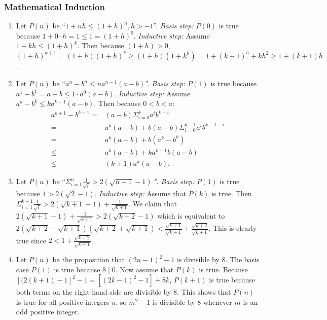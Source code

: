 \documentclass{../../cls/sig-alternate-05-2015}
\begin{document}
\subsubsection{Mathematical Induction}
\begin{enumerate}
\item Let $P(n)$ be \textquotedblleft $1 + nh \le (1 + h)^n, h > -1$\textquotedblright.
\textit{Basis step:} $P(0)$ is true because $1 + 0 \cdot h = 1 \le 1 = (1 + h)^0$.
\textit{Inductive step:} Assume $1 + kh \le (1 + h)^k$. Then because
$(1+h) > 0$, $(1 + h)^{k + 1} = (1 + h)(1 + h)^k \ge (1 + h)(1 + k^h) = 1 + (k + 1)^h + kh^2 \ge 1 + (k + 1)h$.
	
\item Let $P(n)$ be \textquotedblleft $a^n - b^n \le na^{n - 1}(a - b)$\textquotedblright. \textit{Basis step:} $P(1)$ is true because $a^1 - b^1 = a - b \le 1 \cdot a^0 (a - b)$. \textit{Inductive step:} Assume $a^k - b^k \le k a^{k - 1}(a - b)$. Then because $0 < b < a$: \begin{align}
	a^{k + 1} - b^{k + 1} = & (a - b)\Sigma_{i = 0}^k a^i b^{k - i}\\
	= & a^k(a - b) + b(a - b) \Sigma_{i = 0}^{k - 1} a^i b^{k - 1 - i}\\
	= & a^k(a - b) + b(a^k - b^k)\\
	\le & a^k(a - b) + k a^{k - 1} b(a - b)\\
	\le & (k + 1) a^k (a - b).
\end{align}

\item Let $P(n)$ be \textquotedblleft $\Sigma_{i = 1}^n \frac{1}{\sqrt{i}} > 2(\sqrt{n + 1} - 1)$ \textquotedblright. \textit{Basis step:} $P(1)$ is true because $1 > 2(\sqrt{2} - 1)$. \textit{Inductive step:} Assume that $P(k)$ is true. Then $\Sigma_{i = 1}^{k + 1} \frac{1}{\sqrt{i}} > 2(\sqrt{k + 1} - 1) + \frac{1}{\sqrt{k + 1}}$. We claim that $2(\sqrt{k + 1} - 1) + \frac{1}{\sqrt{k + 1}} > 2(\sqrt{k + 2} - 1)$ which is equivalent to $2(\sqrt{k + 2} - \sqrt{k + 1}) (\sqrt{k + 2} + \sqrt{k + 1}) < \frac{\sqrt{k + 1}}{\sqrt{k + 1}} + \frac{\sqrt{k + 2}}{\sqrt{k + 1}}$. This is clearly true since $2 < 1 + \frac{\sqrt{k + 2}}{\sqrt{k + 1}}$.

\item Let $P(n)$ be the proposition that $(2n - 1)^2 - 1$ is divisible by
8. The basis case $P(1)$ is true because $8 \mid 0$. Now assume
that $P(k)$ is true. Because $[(2(k + 1) - 1]^2 − 1 =
[(2k - 1)^2 - 1] + 8k$, $P(k + 1)$ is true because both terms on
the right-hand side are divisible by 8. This shows that $P(n)$ is true for all positive integers $n$, so $m^2 − 1$ is divisible by
8 whenever $m$ is an odd positive integer.


\end{enumerate}
\end{document}
